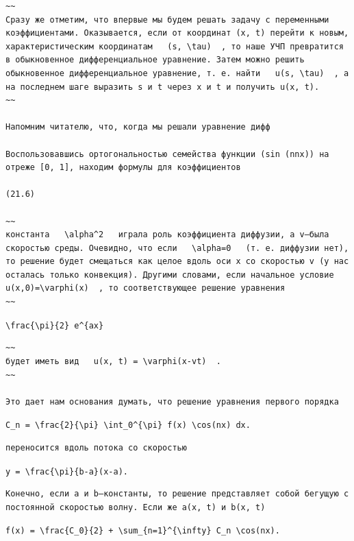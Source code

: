 \documentclass[
  ukrainian,
]{article}
\begin{document}
\begin{verbatim}
~~
Сразу же отметим, что впервые мы будем решать задачу с переменными коэффициентами. Оказывается, если от координат (x, t) перейти к новым, характеристическим координатам   (s, \tau)  , то наше УЧП превратится в обыкновенное дифференциальное уравнение. Затем можно решить обыкновенное дифференциальное уравнение, т. е. найти   u(s, \tau)  , а на последнем шаге выразить s и t через x и t и получить u(x, t).
~~

Напомним читателю, что, когда мы решали уравнение дифф

Воспользовавшись ортогональностью семейства функции (sin (nnx)) на отреже [0, 1], находим формулы для коэффициентов

(21.6) 

~~
константа   \alpha^2   играла роль коэффициента диффузии, а v—была скоростью среды. Очевидно, что если   \alpha=0   (т. е. диффузии нет), то решение будет смещаться как целое вдоль оси x со скоростью v (у нас осталась только конвекция). Другими словами, если начальное условие   u(x,0)=\varphi(x)  , то соответствующее решение уравнения
~~
\end{verbatim}

\texttt{\textbackslash{}frac\{\textbackslash{}pi\}\{2\}\ e\^{}\{ax\}}

\begin{verbatim}
~~
будет иметь вид   u(x, t) = \varphi(x-vt)  .
~~

Это дает нам основания думать, что решение уравнения первого порядка
\end{verbatim}

\texttt{C\_n\ =\ \textbackslash{}frac\{2\}\{\textbackslash{}pi\}\ \textbackslash{}int\_0\^{}\{\textbackslash{}pi\}\ f(x)\ \textbackslash{}cos(nx)\ dx.}

\begin{verbatim}
переносится вдоль потока со скоростью
\end{verbatim}

\texttt{y\ =\ \textbackslash{}frac\{\textbackslash{}pi\}\{b-a\}(x-a).}

\begin{verbatim}
Конечно, если a и b—константы, то решение представляет собой бегущую с постоянной скоростью волну. Если же a(x, t) и b(x, t)
\end{verbatim}

\texttt{f(x)\ =\ \textbackslash{}frac\{C\_0\}\{2\}\ +\ \textbackslash{}sum\_\{n=1\}\^{}\{\textbackslash{}infty\}\ C\_n\ \textbackslash{}cos(nx).}
\end{document}

